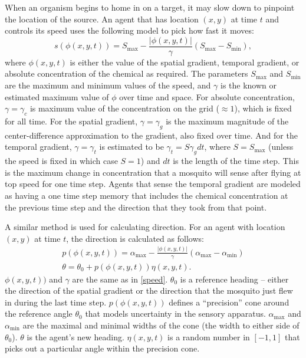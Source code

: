 \documentclass{article}
\begin{document}
When an organism begins to home in on a target, it may slow down to pinpoint the location of the source. An agent that has location $(x,y)$ at time $t$ and controls its speed uses the following model to pick how fast it moves: 
\begin{equation}  \label{speed}
s(\phi(x,y,t)) = S_{\mbox{max}} - \frac{|\phi(x,y,t)|}{\gamma}(S_{\mbox{max}} - S_{\mbox{min}}),
\end{equation}
where $\phi(x,y,t)$ is either the value of the spatial gradient, temporal gradient, or absolute concentration of the chemical as required. The parameters $S_{\mbox{max}}$ and $S_{\mbox{min}}$ are the maximum and minimum values of the speed, and $\gamma$ is the known or estimated maximum value of $\phi$ over time and space. For absolute concentration, $\gamma = \gamma_c$ is maximum value of the concentration on the grid ($\approx 1$), which is fixed for all time. For the spatial gradient, $\gamma = \gamma_g$ is the maximum magnitude of the  center-difference approximation to the gradient, also fixed over time. And for the temporal gradient, $\gamma = \gamma_t$ is estimated to be $\gamma_t = S\gamma_g dt$, where $S = S_{\mbox{max}}$ (unless the speed is fixed in which case $S = 1$) and $dt$ is the length of the time step. This is the maximum change in concentration that a mosquito will sense after flying at top speed for one time step. Agents that sense the temporal gradient are modeled as having a one time step memory that includes the chemical concentration at the previous time step and the direction that they took from that point.

A similar method is used for calculating direction. For an agent with location $(x,y)$ at time $t$, the direction is calculated as follows:
\begin{eqnarray*}
p(\phi(x,y,t)) = \alpha_{\mbox{max}} - \frac{\lvert \phi(x,y,t) \rvert}{\gamma}(\alpha_{\mbox{max}}-\alpha_{\mbox{min}}) \\
\theta = \theta_0 + p(\phi(x,y,t))\eta(x,y,t).
\end{eqnarray*}
$\phi(x,y,t))$ and $\gamma$ are the same as in \eqref{speed}. $\theta_0$ is a reference heading -- either the direction of the spatial gradient or the direction that the mosquito just flew in during the last time step. $p(\phi(x,y,t))$ defines a ``precision'' cone around the reference angle $\theta_0$ that models uncertainty in the sensory apparatus. $\alpha_{\mbox{max}}$ and $\alpha_{\mbox{min}}$ are the maximal and minimal widths of the cone (the width to either side of $\theta_0$). $\theta$ is the agent's new heading. $\eta(x,y,t)$ is a random number in $[-1,1]$ that picks out a particular angle within the precision cone.
\end{document}
